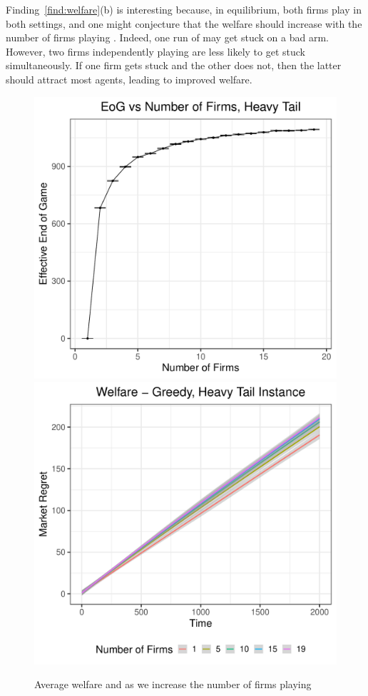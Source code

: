 \documentclass[../competing_bandits_with_appendix.tex]{subfiles}
\begin{document}
Finding~\ref{find:welfare}(b) is interesting because, in equilibrium, both firms play \DynamicGreedy in both settings, and one might conjecture that the welfare should increase with the number of firms playing \DynamicGreedy. Indeed, one run of \DynamicGreedy may get stuck on a bad arm. However, two firms independently playing \DynamicGreedy are less likely to get stuck simultaneously. If one firm gets stuck and the other does not, then the latter should attract most agents, leading to improved welfare.
\begin{figure}
\centering
\includegraphics[scale=0.3]{ec19paper/figures/eeog_vs_num_firms_ht}
\includegraphics[scale=0.3]{ec19paper/figures/ht_many_firm_welfare}\\
\caption{Average welfare and \Eeog as we increase the number of firms playing \DynamicGreedy}
\label{many_firm_welfare}
\end{figure}
\end{document}
